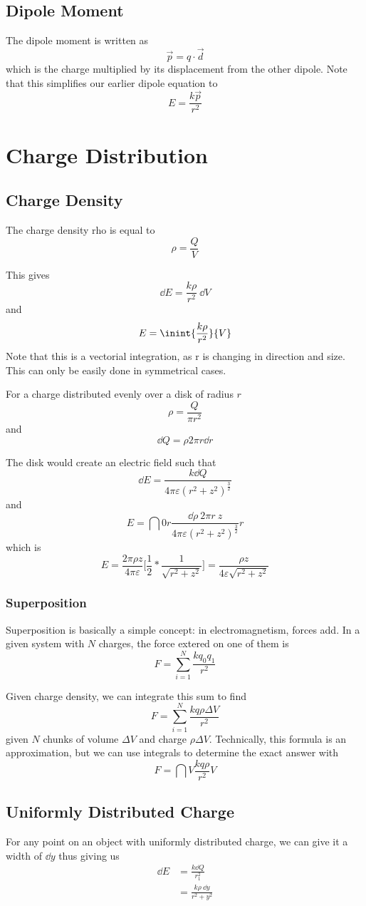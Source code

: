 \documentclass[12pt]{article}
\begin{document}
\subsection*{Dipole Moment}
The dipole moment is written as \[ \vec{p} = q \cdot \vec{d} \] which is the charge multiplied by its displacement from the other dipole. Note that this simplifies our earlier dipole equation to \[ E = \frac{k\vec{p}}{r^2} \]

\section*{Charge Distribution}
\subsection*{Charge Density}
The charge density rho is equal to \[ \rho = \frac{Q}{V} \]

This gives \[ \dd E = \frac{k \rho}{r^2}\ \dd V \] and \[ E = \inint{\frac{k \rho}{r^2}}{V} \] Note that this is a vectorial integration, as r is changing in direction and size. This can only be easily done in symmetrical cases.

For a charge distributed evenly over a disk of radius $r$ \[ \rho = \frac{Q}{\pi r^2} \] and \[ \dd Q = \rho 2\pi r \dd r \]

The disk would create an electric field such that \[ \dd E = \frac{k \dd Q}{4\pi \varepsilon (r^2 + z^2)^{\frac{3}{2}}} \] and \[ E = \dint{0}{r}{\frac{\dd \rho\ 2\pi r\ z}{4\pi \varepsilon (r^2 + z^2)^{\frac{3}{2}}}}{r} \] which is \[ E = \frac{2\pi \rho z}{4\pi \varepsilon} \bigg[\frac{1}{2} * \frac{1}{\sqrt{r^2 + z^2}} \bigg] = \frac{\rho z}{4\varepsilon \sqrt{r^2 + z^2}} \]

\subsubsection*{Superposition}
Superposition is basically a simple concept: in electromagnetism, forces add. In a given system with $N$ charges, the force extered on one of them is \[ F = \sum_{i = 1}^{N} \frac{kq_0q_1}{r^2} \]

Given charge density, we can integrate this sum to find \[ F = \sum_{i = 1}^{N} \frac{kq\rho \Delta V}{r^2} \] given $N$ chunks of volume $\Delta V$ and charge $\rho \Delta V$. Technically, this formula is an approximation, but we can use integrals to determine the exact answer with \[ F = \dint{V}{}{\frac{kq\rho}{r^2}}{V} \]

\subsection*{Uniformly Distributed Charge}
For any point on an object with uniformly distributed charge, we can give it a width of $\dd y$ thus giving us
\begin{align*}
\dd E &= \frac{k \dd Q}{r_1^2} \\
      &= \frac{k \rho\ \dd y}{r^2 + y^2}
\end{align*}
\end{document}
